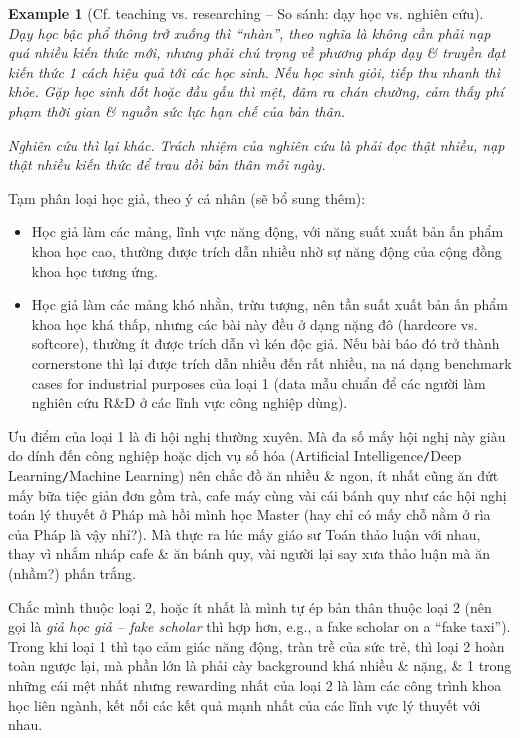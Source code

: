 \documentclass[12pt,oneside]{book}
\newtheorem{example}{Example}
\begin{document}
\begin{example}[Cf. teaching vs. researching -- So sánh: dạy học vs. nghiên cứu]
	Dạy học bậc phổ thông trở xuống thì ``nhàn'', theo nghĩa là không cần phải nạp quá nhiều kiến thức mới, nhưng phải chú trọng về phương pháp dạy \& truyền đạt kiến thức 1 cách hiệu quả tới các học sinh. Nếu học sinh giỏi, tiếp thu nhanh thì khỏe. Gặp học sinh dốt hoặc đầu gấu thì mệt, đâm ra chán chường, cảm thấy phí phạm thời gian \& nguồn sức lực hạn chế của bản thân.
	
	Nghiên cứu thì lại khác. Trách nhiệm của nghiên cứu là phải đọc thật nhiều, nạp thật nhiều kiến thức để trau dồi bản thân mỗi ngày.
\end{example}
Tạm phân loại học giả, theo ý cá nhân (sẽ bổ sung thêm):
\begin{itemize}
	\item Học giả làm các mảng, lĩnh vực năng động, với năng suất xuất bản ấn phẩm khoa học cao, thường được trích dẫn nhiều nhờ sự năng động của cộng đồng khoa học tương ứng.
	\item Học giả làm các mảng khó nhằn, trừu tượng, nên tần suất xuất bản ấn phẩm khoa học khá thấp, nhưng các bài này đều ở dạng nặng đô (hardcore vs. softcore), thường ít được trích dẫn vì kén độc giả. Nếu bài báo đó trở thành cornerstone thì lại được trích dẫn nhiều đến rất nhiều, na ná dạng benchmark cases for industrial purposes của loại 1 (data mẫu chuẩn để các người làm nghiên cứu R\&D ở các lĩnh vực công nghiệp dùng).
\end{itemize}
Ưu điểm của loại 1 là đi hội nghị thường xuyên. Mà đa số mấy hội nghị này giàu do dính đến công nghiệp hoặc dịch vụ số hóa (Artificial Intelligence{\tt/}Deep Learning{\tt/}Machine Learning) nên chắc đồ ăn nhiều \& ngon, ít nhất cũng ăn đứt mấy bữa tiệc giản đơn gồm trà, cafe máy cùng vài cái bánh quy như các hội nghị toán lý thuyết ở Pháp mà hồi mình học Master (hay chỉ có mấy chỗ nằm ở rìa của Pháp là vậy nhỉ?). Mà thực ra lúc mấy giáo sư Toán thảo luận với nhau, thay vì nhắm nháp cafe \& ăn bánh quy, vài người lại say xưa thảo luận mà ăn (nhầm?) phấn trắng.

Chắc mình thuộc loại 2, hoặc ít nhất là mình tự ép bản thân thuộc loại 2 (nên gọi là {\it giả học giả -- fake scholar} thì hợp hơn, e.g., a fake scholar on a ``fake taxi''). Trong khi loại 1 thì tạo cảm giác năng động, tràn trề của sức trẻ, thì loại 2 hoàn toàn ngược lại, mà phần lớn là phải cày background khá nhiều \& nặng, \& 1 trong những cái mệt nhất nhưng rewarding nhất của loại 2 là làm các công trình khoa học liên ngành, kết nối các kết quả mạnh nhất của các lĩnh vực lý thuyết với nhau.
\end{document}
